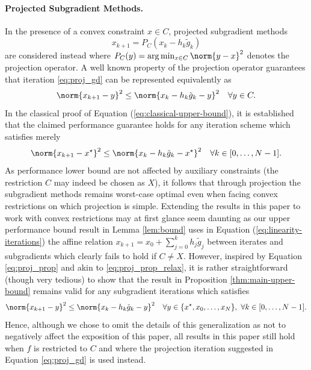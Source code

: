 \documentclass{article}
\begin{document}
\paragraph{Projected Subgradient Methods.}
In the presence of a convex constraint $x\in C$, projected subgradient methods 
\begin{equation}
  \label{eq:proj_gd}
  x_{k+1} = P_C(x_k-h_k \tilde g_k)
\end{equation}
are considered instead where $P_C(y) = \arg\min_{x\in C} \norm{y-x}^2$ denotes the projection operator. 
A well known property of the projection operator guarantees that iteration \eqref{eq:proj_gd} can be represented equivalently as
\begin{equation}
  \label{eq:proj_prop}
  \norm{x_{k+1}-y}^2 \leq \norm{x_k-h_k \tilde g_k - y}^2 \quad \forall y\in C.
\end{equation}
In the classical proof \citep{boyd2003subgradient, lan2020first} of Equation (\ref{eq:classical-upper-bound}), it is established that the claimed performance guarantee holds  for any iteration scheme which satisfies merely
\begin{equation}
  \label{eq:proj_prop_relax}
  \norm{x_{k+1}-x^\star}^2 \leq \norm{x_k-h_k \tilde g_k - x^\star}^2 \quad \forall k\in [0, \dots, N-1].
\end{equation}
As performance lower bound are not affected by auxiliary constraints (the restriction $C$ may indeed be chosen as $X$), it follows that through projection the subgradient methods remains worst-case optimal even when facing convex restrictions on which projection is simple.
Extending the results in this paper to work with convex restrictions may at first glance seem daunting as our upper performance bound result in Lemma \ref{lem:bound} uses in Equation (\ref{eq:linearity-iterations}) the affine relation $x_{k+1} = x_0+ \sum_{j=0}^kh_j\tilde g_j$ between iterates and subgradients which clearly fails to hold if $C\neq X$.
However, inspired by Equation \eqref{eq:proj_prop} and akin to \eqref{eq:proj_prop_relax}, it is rather straightforward (though very tedious) to show that the result in Proposition \ref{thm:main-upper-bound} remains valid for any subgradient iterations which satisfies
\begin{equation}
  \label{eq:proj_prop_relax_2}
  \norm{x_{k+1}-y}^2 \leq \norm{x_k-h_k \tilde g_k - y}^2 \quad \forall y \in \{x^\star, x_0, \dots, x_{N}\}, ~\forall k\in [0, \dots, N-1].
\end{equation}
Hence, although we chose to omit the details of this generalization as not to negatively affect the exposition of this paper, all results in this paper still hold when $f$ is restricted to $C$ and where the projection iteration suggested in Equation \eqref{eq:proj_gd} is used instead.
\end{document}
